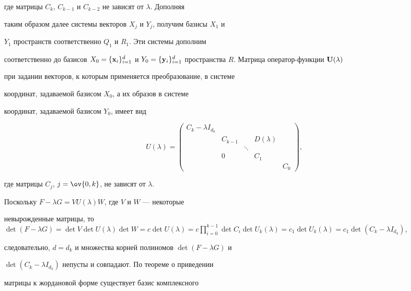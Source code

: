\begin{pf}
где матрицы $C_k$, $C_{k-1}$ и $C_{k-2}$ не зависят от $\lambda$. Дополняя 


таким образом далее системы векторов $X_j$ и $Y_j$, получим базисы $X_1$ и 


$Y_1$ пространств соответственно $Q_1$ и $R_1$. Эти системы дополним 


соответственно до базисов $X_0=\{\bold x_i\}^d_{i=1}$ и $Y_0=\{\bold 


y_i\}^d_{i=1}$ пространства $R$. Матрица оператор-функции $\bold U(\lambda)$ 


при задании векторов, к которым применяется преобразование, в системе 


координат, задаваемой базисом $X_0$, а их образов в системе 


координат, задаваемой базисом $Y_0$, имеет вид 


$$ 


U(\lambda)= 


\begin{pmatrix} 


C_k-\lambda I_{d_k} & \ & \ & \ & \ \\ 


\ & C_{k-1} & \ & D(\lambda) & \ \\ 


\ & \ & \ddots & \ & \ \\ 


\ & 0 & \ & C_1 & \ \\ 


\ & \ & \ & \ & C_0 


\end{pmatrix}, 


$$ 


где матрицы $C_j$, $j=\ov{0,k}$, не зависят от $\lambda$. 


 


Поскольку $F-\lambda G=V U(\lambda)W$, где $V$ и $W$ --- некоторые 


невырожденные матрицы, то $\det(F-\lambda G)=\det V\det U(\lambda)\det 


W=c\det U(\lambda)=c\prod\limits^{k-1}_{i=0}\det C_i\det U_k(\lambda)=c_1\det 


U_k(\lambda)=c_1\det(C_k-\lambda I_{d_k})$, 


следовательно, $d=d_k$ и множества корней полиномов $\det(F-\lambda G)$ и 


$\det(C_k-\lambda I_{d_k})$ непусты и совпадают. По теореме о приведении 


матрицы к жордановой форме существует базис комплексного 



\end{pf}
